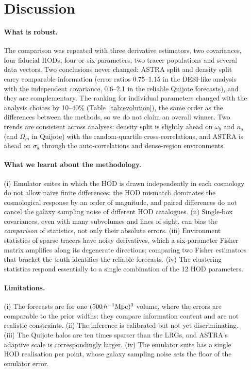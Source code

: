 \section{Discussion}
\label{sec:discussion}

\paragraph{What is robust.} The comparison was repeated with three derivative estimators, two covariances, four fiducial HODs, four or six parameters, two tracer populations and several data vectors. Two conclusions never changed: ASTRA split and density split carry comparable information (error ratios 0.75--1.15 in the DESI-like analysis with the independent covariance, 0.6--2.1 in the reliable Quijote forecasts), and they are complementary. The ranking for individual parameters changed with the analysis choices by 10--40\% (Table~\ref{tab:evolution}), the same order as the differences between the methods, so we do not claim an overall winner. Two trends are consistent across analyses: density split is slightly ahead on $\omega_b$ and $n_s$ (and $\Omega_m$ in Quijote) with the random-quartile cross-correlations, and ASTRA is ahead on $\sigma_8$ through the auto-correlations and dense-region environments.

\paragraph{What we learnt about the methodology.} (i) Emulator suites in which the HOD is drawn independently in each cosmology do not allow naive finite differences: the HOD mismatch dominates the cosmological response by an order of magnitude, and paired differences do not cancel the galaxy sampling noise of different HOD catalogues. (ii) Single-box covariances, even with many subvolumes and lines of sight, can bias the \emph{comparison} of statistics, not only their absolute errors. (iii) Environment statistics of sparse tracers have noisy derivatives, which a six-parameter Fisher matrix amplifies along its degenerate directions; comparing two Fisher estimators that bracket the truth identifies the reliable forecasts. (iv) The clustering statistics respond essentially to a single combination of the 12 HOD parameters.

\paragraph{Limitations.} (i) The forecasts are for one $(500\,h^{-1}\mathrm{Mpc})^3$ volume, where the errors are comparable to the prior widths: they compare information content and are not realistic constraints. (ii) The inference is calibrated but not yet discriminating. (iii) The Quijote halos are ten times sparser than the LRGs, and ASTRA's adaptive scale is correspondingly larger. (iv) The emulator suite has a single HOD realisation per point, whose galaxy sampling noise sets the floor of the emulator error.

